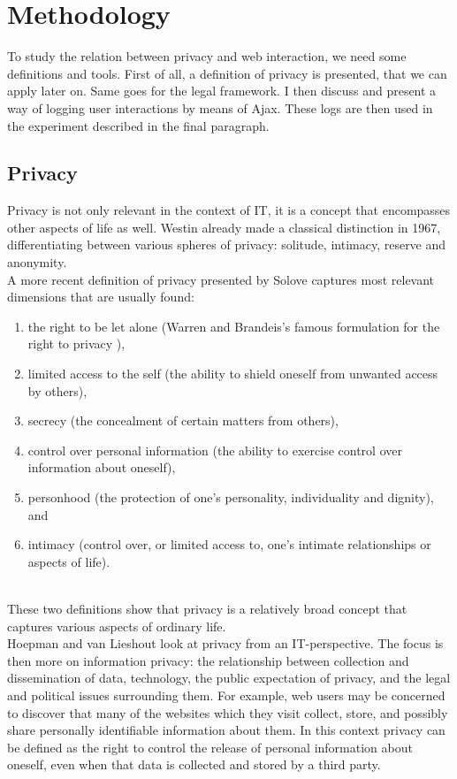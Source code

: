 \section{Methodology}
\label{sec:methodology}

To study the relation between privacy and web interaction, we need some definitions and tools. First of all, a definition of privacy is presented, that we can apply later on. Same goes for the legal framework. I then discuss and present a way of logging user interactions by means of Ajax. These logs are then used in the experiment described in the final paragraph.
	
\subsection{Privacy}	
Privacy is not only relevant in the context of IT, it is a concept that encompasses other aspects of life as well.
Westin \cite{westin1968privacy} already made a classical distinction in 1967, differentiating between various spheres of privacy: solitude, intimacy, reserve and anonymity.\\

A more recent definition of privacy presented by Solove \cite{solove2002conceptualizing} captures most relevant dimensions that are usually found:
\begin{enumerate}
	\item the right to be let alone (Warren and Brandeis's famous formulation for the right to privacy \cite{warren1890right}),
	\item limited access to the self (the ability to shield oneself from unwanted access by others), 
	\item secrecy (the concealment of certain matters from others),
	\item control over personal information (the ability to exercise control over information about oneself), 
	\item personhood (the protection of one's personality, individuality and dignity), and 
	\item intimacy (control over, or limited access to, one's intimate relationships or aspects of life).
\end{enumerate} 
~\\
These two definitions show that privacy is a relatively broad concept that captures various aspects of ordinary life.\\

Hoepman and van Lieshout \cite{privacy} look at privacy from an IT-perspective. The focus is then more on information privacy: the relationship between collection and dissemination of data, technology, the public expectation of privacy, and the legal and political issues surrounding them. For example, web users may be concerned to discover that many of the websites which they visit collect, store, and possibly share personally identifiable information about them. In this context privacy can be defined as the right to control the release of personal information about oneself, even when that data is collected and stored by a third party.\\

